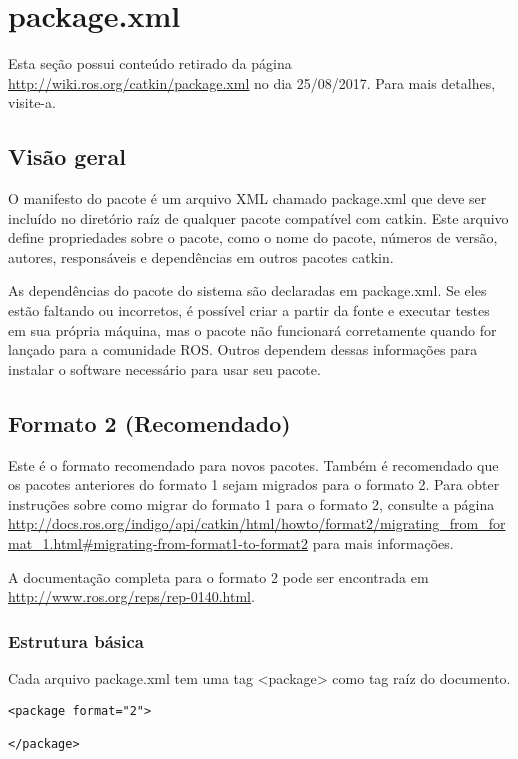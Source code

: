 \chapter{package.xml}
\label{package}

Esta seção possui conteúdo retirado da página \url{http://wiki.ros.org/catkin/package.xml} no dia 25/08/2017. Para mais detalhes, visite-a.

\section{Visão geral}

O manifesto do pacote é um arquivo XML chamado package.xml que deve ser incluído no diretório raíz de qualquer pacote compatível com catkin. Este arquivo define propriedades sobre o pacote, como o nome do pacote, números de versão, autores, responsáveis e dependências em outros pacotes catkin.

As dependências do pacote do sistema são declaradas em package.xml. Se eles estão faltando ou incorretos, é possível criar a partir da fonte e executar testes em sua própria máquina, mas o pacote não funcionará corretamente quando for lançado para a comunidade ROS. Outros dependem dessas informações para instalar o software necessário para usar seu pacote.

\section{Formato 2 (Recomendado)}

Este é o formato recomendado para novos pacotes. Também é recomendado que os pacotes anteriores do formato 1 sejam migrados para o formato 2. Para obter instruções sobre como migrar do formato 1 para o formato 2, consulte a página \url{http://docs.ros.org/indigo/api/catkin/html/howto/format2/migrating_from_format_1.html#migrating-from-format1-to-format2} para mais informações.

A documentação completa para o formato 2 pode ser encontrada em \url{http://www.ros.org/reps/rep-0140.html}. 

\subsection{Estrutura básica}

Cada arquivo package.xml tem uma tag <package> como tag raíz do documento.

\begin{verbatim}
<package format="2">

</package>
\end{verbatim}

